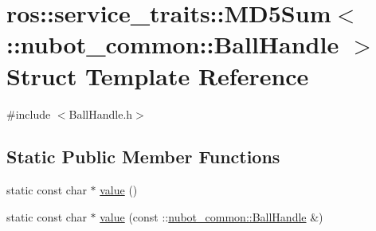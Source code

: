 \hypertarget{structros_1_1service__traits_1_1MD5Sum_3_01_1_1nubot__common_1_1BallHandle_01_4}{\section{ros\-:\-:service\-\_\-traits\-:\-:M\-D5\-Sum$<$ \-:\-:nubot\-\_\-common\-:\-:Ball\-Handle $>$ Struct Template Reference}
\label{structros_1_1service__traits_1_1MD5Sum_3_01_1_1nubot__common_1_1BallHandle_01_4}
}


{\ttfamily \#include $<$Ball\-Handle.\-h$>$}

\subsection*{Static Public Member Functions}
\begin{DoxyCompactItemize}
\item 
static const char $\ast$ \hyperlink{structros_1_1service__traits_1_1MD5Sum_3_01_1_1nubot__common_1_1BallHandle_01_4_aab77e390e801fe5577b5410690a75893}{value} ()
\item 
static const char $\ast$ \hyperlink{structros_1_1service__traits_1_1MD5Sum_3_01_1_1nubot__common_1_1BallHandle_01_4_a6a3da4315540ebf8b82f7859b95431b4}{value} (const \-::\hyperlink{structnubot__common_1_1BallHandle}{nubot\-\_\-common\-::\-Ball\-Handle} \&)
\end{DoxyCompactItemize}


